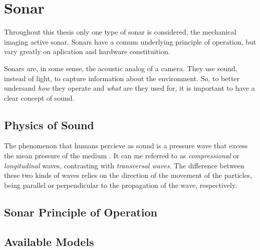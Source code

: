 \section{Sonar}

Throughout this thesis only one type of sonar is considered, the mechanical
imaging active sonar. Sonars have a comum underlying principle of operation, but
vary greatly on aplication and hardware constituition.

Sonars are, in some sense, the acoustic analog of a camera. They use sound,
instead of light, to capture information about the environment. So, to better
undersand \textit{how} they operate and \textit{what} are they used for, it is
important to have a clear concept of sound.

\subsection{Physics of Sound}

The phenomenon that humans percieve as sound is a pressure wave that excess the
mean pressure of the medium \cite{FEYNMAN}. It can me referred to as
\textit{compressional} or \textit{longitudinal} waves, contrasting with
\textit{transversal waves}. The difference between these two kinds of waves
relies on the direction of the movement of the particles, being parallel or
perpendicular to the propagation of the wave, respectively\cite{BRUNEAU}.





\subsection{Sonar Principle of Operation}

\cite{LURTON} %

\subsection{Available Models}
 
\cite{sonars:16} %
